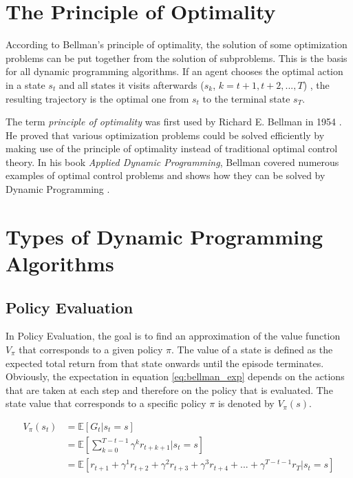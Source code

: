 \section{The Principle of Optimality}
\label{sec:optimality}

According to Bellman's principle of optimality, the solution of some optimization problems can be put together from the solution of subproblems. This is the basis for all dynamic programming algorithms. If an agent chooses the optimal action in a state $s_t$ and all states it visits afterwards ($s_k$, $k=t+1, t+2, ...,T$) , the resulting trajectory is the optimal one from $s_t$ to the terminal state $s_T$.

The term \textit{principle of optimality} was first used by Richard E. Bellman in 1954 \cite{Bellman1954}. He proved that various optimization problems could be solved efficiently by making use of the principle of optimality instead of traditional optimal control theory. In his book \textit{Applied Dynamic Programming}, Bellman covered numerous examples of optimal control problems and shows how they can be solved by Dynamic Programming \cite{Bellman1962}.

\section{Types of Dynamic Programming Algorithms}

\subsection{Policy Evaluation}
\label{subsection:policy_evaluation}

In Policy Evaluation, the goal is to find an approximation of the value function $V_\pi$ that corresponds to a given policy $\pi$. The value of a state is defined as the expected total return from that state onwards until the episode terminates. Obviously, the expectation in equation \ref{eq:bellman_exp} depends on the actions that are taken at each step and therefore on the policy that is evaluated. The state value that corresponds to a specific policy $\pi$ is denoted by $V_\pi(s)$.

\begin{align}
V_\pi(s_t)&=\mathbb{E}[G_t|s_t=s]\\ &= \mathbb{E}\left[ \sum_{k=0}^{T-t-1}\gamma^k r_{t+k+1}|s_t=s\right] \\
&=\mathbb{E}[r_{t+1}+\gamma^1 r_{t+2}+\gamma^2 r_{t+3}+\gamma^3 r_{t+4}+...+\gamma^{T-t-1}r_T|s_t=s]
\label{eq:bellman_exp}
\end{align}

